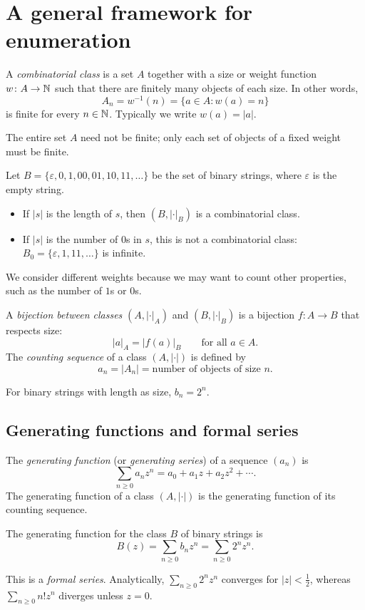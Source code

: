 \section{A general framework for enumeration}
\begin{definition}
A \textit{combinatorial class} is a set $A$ together with a size or weight function $w\colon A\to\mathbb{N}$ such that there are finitely many objects of each size. In other words,
\[
A_n=w^{-1}(n)=\{a\in A:w(a)=n\}
\]
is finite for every $n\in\mathbb{N}$. Typically we write $w(a)=|a|$.
\end{definition}
\begin{remark}
The entire set $A$ need not be finite; only each set of objects of a fixed weight must be finite.
\end{remark}
\begin{example}
Let $B=\{\varepsilon,0,1,00,01,10,11,\ldots\}$ be the set of binary strings, where $\varepsilon$ is the empty string.
\begin{itemize}
\item If $|s|$ is the length of $s$, then $(B,|\cdot|_B)$ is a combinatorial class.
\item If $|s|$ is the number of $0$s in $s$, this is not a combinatorial class: $B_0=\{\varepsilon,1,11,\ldots\}$ is infinite.
\end{itemize}
We consider different weights because we may want to count other properties, such as the number of $1$s or $0$s.
\end{example}
\begin{definition}
A \textit{bijection between classes} $(A,|\cdot|_A)$ and $(B,|\cdot|_B)$ is a bijection $f\colon A\to B$ that respects size:
\[
|a|_A=|f(a)|_B\qquad\text{for all }a\in A.
\]
The \textit{counting sequence} of a class $(A,|\cdot|)$ is defined by
\[
a_n=|A_n|=\text{number of objects of size $n$}.
\]
\end{definition}
For binary strings with length as size, $b_n=2^n$.

\subsection{Generating functions and formal series}
\begin{definition}
The \textit{generating function} (or \textit{generating series}) of a sequence $(a_n)$ is
\[
\sum_{n\ge0}a_nz^n=a_0+a_1z+a_2z^2+\cdots.
\]
The generating function of a class $(A,|\cdot|)$ is the generating function of its counting sequence.
\end{definition}
\begin{example}
The generating function for the class $B$ of binary strings is
\[
B(z)=\sum_{n\ge0}b_nz^n=\sum_{n\ge0}2^nz^n.
\]
\end{example}
This is a \textit{formal series}. Analytically, $\displaystyle \sum_{n\ge0}2^nz^n$ converges for $|z|<\frac12$, whereas $\displaystyle \sum_{n\ge0}n!z^n$ diverges unless $z=0$.

